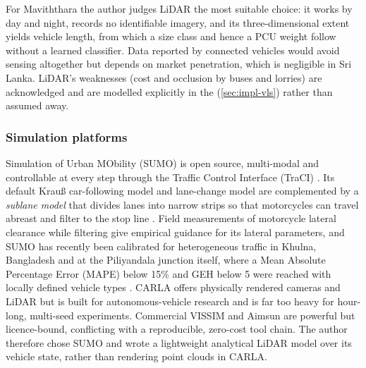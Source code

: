 For Maviththara the author judges LiDAR the most suitable choice: it works by day and night, records no
identifiable imagery, and its three-dimensional extent yields vehicle length, from which a size class and hence
a PCU weight follow without a learned classifier. Data reported by connected vehicles \cite{goodall2013cv} would avoid sensing
altogether but depends on market penetration, which is negligible in Sri Lanka. LiDAR's weaknesses (cost and
occlusion by buses and lorries) are acknowledged and are modelled explicitly in the \vls{}
(\cref{sec:impl-vls}) rather than assumed away.

\subsubsection{Simulation platforms}
Simulation of Urban MObility (SUMO) \cite{lopez2018sumo} is open source, multi-modal and controllable at every step through the
Traffic Control Interface (TraCI) \cite{wegener2008traci}. Its default Krau{\ss} car-following model
\cite{krauss1998} and lane-change model \cite{erdmann2015lanechange} are complemented by a \emph{sublane model}
that divides lanes into narrow strips so that motorcycles can travel abreast and filter to the stop line
\cite{sumo_sublane}. Field measurements of motorcycle lateral clearance while filtering \cite{promraksa2022lane}
give empirical guidance for its lateral parameters, and SUMO has recently been calibrated for heterogeneous
traffic in Khulna, Bangladesh \cite{chowdhury2024calibration} and at the Piliyandala junction itself, where
a Mean Absolute Percentage Error (MAPE) below 15\% and GEH below 5 were reached with locally defined vehicle types \cite{salawavidana2026aggregate}. CARLA \cite{dosovitskiy2017carla} offers physically rendered cameras and LiDAR but is
built for autonomous-vehicle research and is far too heavy for hour-long, multi-seed experiments. Commercial
VISSIM and Aimsun are powerful but licence-bound, conflicting with a reproducible, zero-cost tool chain. The author therefore chose SUMO and wrote a lightweight
analytical LiDAR model over its vehicle state, rather than rendering point clouds in CARLA.

